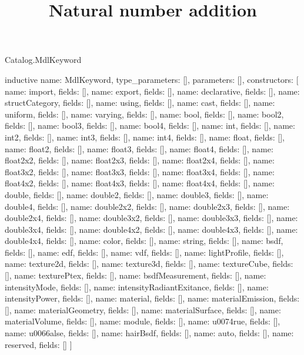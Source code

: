 \begin{lexlean}{Catalog.MdlKeyword}
\title{Natural number addition}
\begin{semanticmodule}
inductive{
  name: MdlKeyword,
  type_parameters: [],
  parameters: [],
  constructors: [
    {name: import, fields: []},
    {name: export, fields: []},
    {name: declarative, fields: []},
    {name: structCategory, fields: []},
    {name: using, fields: []},
    {name: cast, fields: []},
    {name: uniform, fields: []},
    {name: varying, fields: []},
    {name: bool, fields: []},
    {name: bool2, fields: []},
    {name: bool3, fields: []},
    {name: bool4, fields: []},
    {name: int, fields: []},
    {name: int2, fields: []},
    {name: int3, fields: []},
    {name: int4, fields: []},
    {name: float, fields: []},
    {name: float2, fields: []},
    {name: float3, fields: []},
    {name: float4, fields: []},
    {name: float2x2, fields: []},
    {name: float2x3, fields: []},
    {name: float2x4, fields: []},
    {name: float3x2, fields: []},
    {name: float3x3, fields: []},
    {name: float3x4, fields: []},
    {name: float4x2, fields: []},
    {name: float4x3, fields: []},
    {name: float4x4, fields: []},
    {name: double, fields: []},
    {name: double2, fields: []},
    {name: double3, fields: []},
    {name: double4, fields: []},
    {name: double2x2, fields: []},
    {name: double2x3, fields: []},
    {name: double2x4, fields: []},
    {name: double3x2, fields: []},
    {name: double3x3, fields: []},
    {name: double3x4, fields: []},
    {name: double4x2, fields: []},
    {name: double4x3, fields: []},
    {name: double4x4, fields: []},
    {name: color, fields: []},
    {name: string, fields: []},
    {name: bsdf, fields: []},
    {name: edf, fields: []},
    {name: vdf, fields: []},
    {name: lightProfile, fields: []},
    {name: texture2d, fields: []},
    {name: texture3d, fields: []},
    {name: textureCube, fields: []},
    {name: texturePtex, fields: []},
    {name: bsdfMeasurement, fields: []},
    {name: intensityMode, fields: []},
    {name: intensityRadiantExitance, fields: []},
    {name: intensityPower, fields: []},
    {name: material, fields: []},
    {name: materialEmission, fields: []},
    {name: materialGeometry, fields: []},
    {name: materialSurface, fields: []},
    {name: materialVolume, fields: []},
    {name: module, fields: []},
    {name: u0074rue, fields: []},
    {name: u0066alse, fields: []},
    {name: hairBsdf, fields: []},
    {name: auto, fields: []},
    {name: reserved, fields: []}
  ]
}
\end{semanticmodule}
\end{lexlean}
